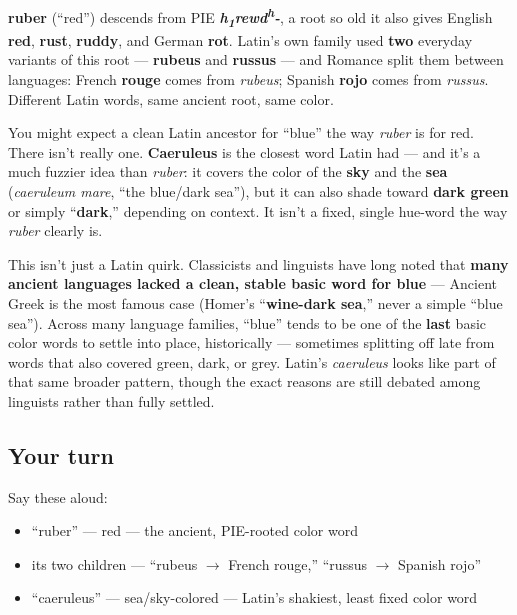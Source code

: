 \begin{cousinweb}
\textbf{ruber} (\textquotedblleft{}red\textquotedblright{}) descends from PIE \emph{\textbf{h\textsubscript{1}rewd\textsuperscript{h}-}}, a root so old it also gives English \textbf{red}, \textbf{rust}, \textbf{ruddy}, and German \textbf{rot}. Latin's own family used \textbf{two} everyday variants of this root — \textbf{rubeus} and \textbf{russus} — and Romance split them between languages: French \textbf{rouge} comes from \emph{rubeus}; Spanish \textbf{rojo} comes from \emph{russus}. Different Latin words, same ancient root, same color.
\end{cousinweb}

\begin{cousinweb}
You might expect a clean Latin ancestor for \textquotedblleft{}blue\textquotedblright{} the way \emph{ruber} is for red. There isn't really one. \textbf{Caeruleus} is the closest word Latin had — and it's a much fuzzier idea than \emph{ruber}: it covers the color of the \textbf{sky} and the \textbf{sea} (\emph{caeruleum mare}, \textquotedblleft{}the blue/dark sea\textquotedblright{}), but it can also shade toward \textbf{dark green} or simply \textquotedblleft{}\textbf{dark},\textquotedblright{} depending on context. It isn't a fixed, single hue-word the way \emph{ruber} clearly is.

This isn't just a Latin quirk. Classicists and linguists have long noted that \textbf{many ancient languages lacked a clean, stable basic word for blue} — Ancient Greek is the most famous case (Homer's \textquotedblleft{}\textbf{wine-dark sea},\textquotedblright{} never a simple \textquotedblleft{}blue sea\textquotedblright{}). Across many language families, \textquotedblleft{}blue\textquotedblright{} tends to be one of the \textbf{last} basic color words to settle into place, historically — sometimes splitting off late from words that also covered green, dark, or grey. Latin's \emph{caeruleus} looks like part of that same broader pattern, though the exact reasons are still debated among linguists rather than fully settled.
\end{cousinweb}

\subsection*{Your turn}
Say these aloud:

\begin{itemize}
\raggedright
  \item \textquotedblleft{}ruber\textquotedblright{} — red — the ancient, PIE-rooted color word
  \item its two children — \textquotedblleft{}rubeus $\to$ French rouge,\textquotedblright{} \textquotedblleft{}russus $\to$ Spanish rojo\textquotedblright{}
  \item \textquotedblleft{}caeruleus\textquotedblright{} — sea/sky-colored — Latin's shakiest, least fixed color word
\end{itemize}

